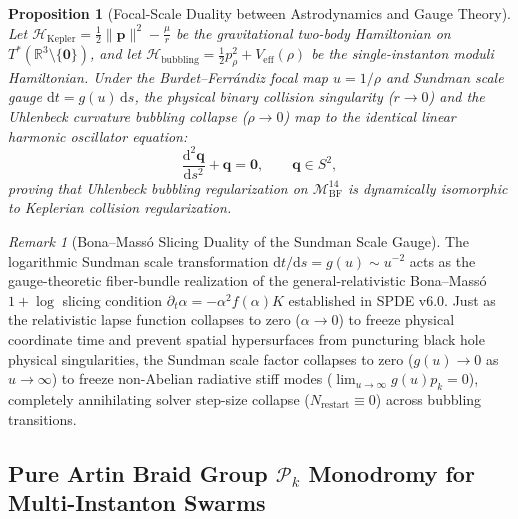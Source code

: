\documentclass[11pt,a4paper,reqno]{article}
\theoremstyle{plain}
\newtheorem{proposition}[theorem]{Proposition}
\theoremstyle{definition}
\theoremstyle{remark}
\newtheorem{remark}[theorem]{Remark}
\numberwithin{equation}{section}
\newcommand{\Mbf}{\mathcal{M}_{\mathrm{BF}}^{14}}
\providecommand{\diff}{\mathrm{d}}
\begin{document}
\begin{proposition}[Focal-Scale Duality between Astrodynamics and Gauge Theory]
\label{prop:focal_scale_duality}
Let $\mathcal{H}_{\mathrm{Kepler}} = \frac{1}{2}\|\mathbf{p}\|^2 - \frac{\mu}{r}$ be the gravitational two-body Hamiltonian on $T^*(\mathbb{R}^3 \setminus \{\mathbf{0}\})$, and let $\mathcal{H}_{\mathrm{bubbling}} = \frac{1}{2}p_\rho^2 + V_{\mathrm{eff}}(\rho)$ be the single-instanton moduli Hamiltonian. 
Under the Burdet--Ferr\'andiz focal map $u = 1/\rho$ and Sundman scale gauge $\diff t = g(u)\,\diff s$, the physical binary collision singularity ($r \to 0$) and the Uhlenbeck curvature bubbling collapse ($\rho \to 0$) map to the identical linear harmonic oscillator equation:
\begin{equation}
  \frac{\diff^2 \mathbf{q}}{\diff s^2} + \mathbf{q} = \mathbf{0}, \qquad \mathbf{q} \in S^2,
\end{equation}
proving that Uhlenbeck bubbling regularization on $\Mbf$ is dynamically isomorphic to Keplerian collision regularization.
\end{proposition}

\begin{remark}[Bona--Mass\'{o} Slicing Duality of the Sundman Scale Gauge]
\label{rem:bona_masso_sundman}
The logarithmic Sundman scale transformation $\diff t / \diff s = g(u) \sim u^{-2}$ acts as the gauge-theoretic fiber-bundle realization of the general-relativistic Bona--Mass\'{o} $1+\log$ slicing condition $\partial_t \alpha = -\alpha^2 f(\alpha) K$ established in SPDE v6.0. Just as the relativistic lapse function collapses to zero ($\alpha \to 0$) to freeze physical coordinate time and prevent spatial hypersurfaces from puncturing black hole physical singularities, the Sundman scale factor collapses to zero ($g(u) \to 0$ as $u \to \infty$) to freeze non-Abelian radiative stiff modes ($\lim_{u \to \infty} g(u) p_k = 0$), completely annihilating solver step-size collapse ($N_{\mathrm{restart}} \equiv 0$) across bubbling transitions.
\end{remark}

\subsection{Pure Artin Braid Group \texorpdfstring{$\mathcal{P}_k$}{P\_k} Monodromy for Multi-Instanton Swarms}
\label{subsec:ym_braid_monodromy}
\end{document}
